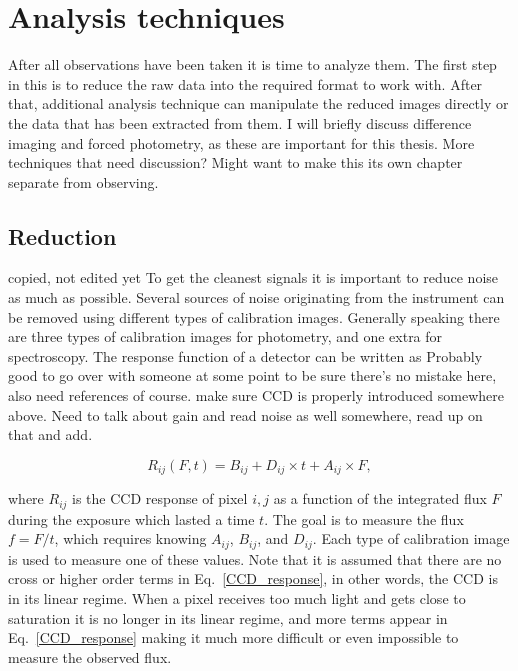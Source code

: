 \documentclass[a4paper,oneside,12pt, class=Latex/Classes/PhDthesisPSnPDF, crop=false]{standalone}
\begin{document}
\doublespacing
\chapter{Analysis techniques}
\label{chap:analysis}


After all observations have been taken it is time to analyze them. The first step in this is to reduce the raw data into the required format to work with. After that, additional analysis technique can manipulate the reduced images directly or the data that has been extracted from them. I will briefly discuss difference imaging and forced photometry, as these are important for this thesis. \color{red} More techniques that need discussion? Might want to make this its own chapter separate from observing.\color{black}

\section{Reduction}
\label{reduction}

\color{red} copied, not edited yet \color{black}
To get the cleanest signals it is important to reduce noise as much as possible. Several sources of noise originating from the instrument can be removed using different types of calibration images. Generally speaking there are three types of calibration images for photometry, and one extra for spectroscopy. The response function of a detector can be written as \color{red} Probably good to go over with someone at some point to be sure there's no mistake here, also need references of course. make sure CCD is properly introduced somewhere above. Need to talk about gain and read noise as well somewhere, read up on that and add. \color{black}

\begin{equation}
	R_{ij}(F, t) = B_{ij} + D_{ij} \times t + A_{ij} \times F,
	\label{CCD_response}
\end{equation}

where $R_{ij}$ is the CCD response of pixel $i,j$ as a function of the integrated flux $F$ during the exposure which lasted a time $t$. The goal is to measure the flux $f = F/t$, which requires knowing $A_{ij}$, $B_{ij}$, and $D_{ij}$. Each type of calibration image is used to measure one of these values. Note that it is assumed that there are no cross or higher order terms in Eq.~\ref{CCD_response}, in other words, the CCD is in its linear regime. When a pixel receives too much light and gets close to saturation it is no longer in its linear regime, and more terms appear in Eq.~\ref{CCD_response} making it much more difficult or even impossible to measure the observed flux.
\end{document}
